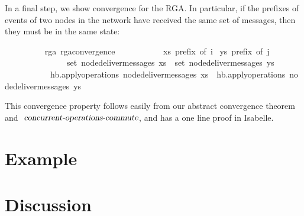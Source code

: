 \documentclass[acmlarge,review,anonymous]{acmart}\settopmatter{printfolios=true}
\begin{document}
\vspace{\baselineskip}
In a final step, we show convergence for the RGA.
In particular, if the prefixes of events of two nodes in the network have received the same set of messages, then they must be in the same state:
\isanewline
\begin{isabellebody}
\ \ \ \ \ \ \ \  {\isacharparenleft}\ rga{\isacharparenright}\ rga{\isacharunderscore}convergence{\isacharcolon}\isanewline
\ \ \ \ \ \ \ \ \ \ \ {\isachardoublequoteopen}xs\ prefix\ of\ i{\isachardoublequoteclose} \ {\isachardoublequoteopen}ys\ prefix\ of\ j{\isachardoublequoteclose}\isanewline
\ \ \ \ \ \ \ \ \ \ \ \ \ \ \ {\isachardoublequoteopen}set\ {\isacharparenleft}node{\isacharunderscore}deliver{\isacharunderscore}messages\ xs{\isacharparenright}\ {\isacharequal}\ set\ {\isacharparenleft}node{\isacharunderscore}deliver{\isacharunderscore}messages\ ys{\isacharparenright}{\isachardoublequoteclose}\isanewline
\ \ \ \ \ \ \ \ \ \ \ {\isachardoublequoteopen}hb.apply{\isacharunderscore}operations\ {\isacharparenleft}node{\isacharunderscore}deliver{\isacharunderscore}messages\ xs{\isacharparenright}\ {\isacharequal}\ hb.apply{\isacharunderscore}operations\ {\isacharparenleft}node{\isacharunderscore}deliver{\isacharunderscore}messages\ ys{\isacharparenright}{\isachardoublequoteclose}
\end{isabellebody}
\vspace{\baselineskip}
This convergence property follows easily from our abstract convergence theorem and $\isa{concurrent-operations-commute}$, and has a one line proof in Isabelle.


\section{Example}
\label{sect.example}


\section{Discussion}
\label{sect.discussion}
\end{document}
